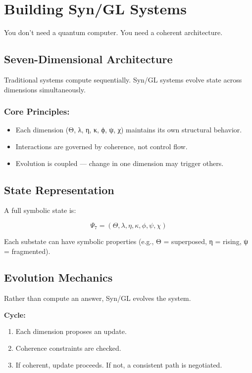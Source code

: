 
\chapter{Building Syn/GL Systems}

You don’t need a quantum computer. You need a coherent architecture.

\section{Seven-Dimensional Architecture}

Traditional systems compute sequentially. Syn/GL systems evolve state across dimensions simultaneously.

\subsection*{Core Principles:}

\begin{itemize}
\item Each dimension (Θ, λ, η, κ, ϕ, ψ, χ) maintains its own structural behavior.
\item Interactions are governed by coherence, not control flow.
\item Evolution is coupled — change in one dimension may trigger others.
\end{itemize}

\section{State Representation}

A full symbolic state is:

\[
\Psi_7 = (\Theta, \lambda, \eta, \kappa, \phi, \psi, \chi)
\]

Each substate can have symbolic properties (e.g., Θ = superposed, η = rising, ψ = fragmented).

\section{Evolution Mechanics}

Rather than compute an answer, Syn/GL evolves the system.

\textbf{Cycle:}
\begin{enumerate}
\item Each dimension proposes an update.
\item Coherence constraints are checked.
\item If coherent, update proceeds. If not, a consistent path is negotiated.
\end{enumerate}

